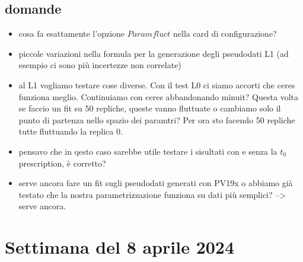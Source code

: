 \documentclass{article}
\begin{document}
\subsection{domande}

\begin{itemize}
    \item cosa fa esattamente l'opzione $Paramfluct$ nella card di configurazione?
    \item piccole variazioni nella formula per la generazione degli pseudodati L1 (ad esempio ci sono più incertezze non correlate)
    \item al L1 vogliamo testare cose diverse. Con il test L0 ci siamo accorti che ceres funziona meglio. Continuiamo con ceres abbandonando minuit? Questa volta se faccio un fit su 50 repliche, queste vanno fluttuate o cambiamo solo il punto di partenza nello spazio dei paramtri? Per ora sto facendo 50 repliche tutte fluttuando la replica 0.
    \item pensavo che in qesto caso sarebbe utile testare i sisultati con e senza la $t_0$ prescription, è corretto?

    \item serve ancora fare un fit sugli pseudodati generati con PV19x o abbiamo già testato che la nostra parametrizzazione funziona su dati più semplici? --> serve ancora.
\end{itemize}

\section{Settimana del 8 aprile 2024}
\end{document}
